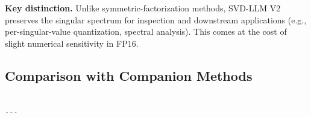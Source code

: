 \textbf{Key distinction.} Unlike symmetric-factorization methods, SVD-LLM V2 
preserves the singular spectrum for inspection and downstream applications 
(e.g., per-singular-value quantization, spectral analysis). This comes at 
the cost of slight numerical sensitivity in FP16.



\subsection{Comparison with Companion Methods}

\begin{lstlisting}

---
\end{lstlisting}